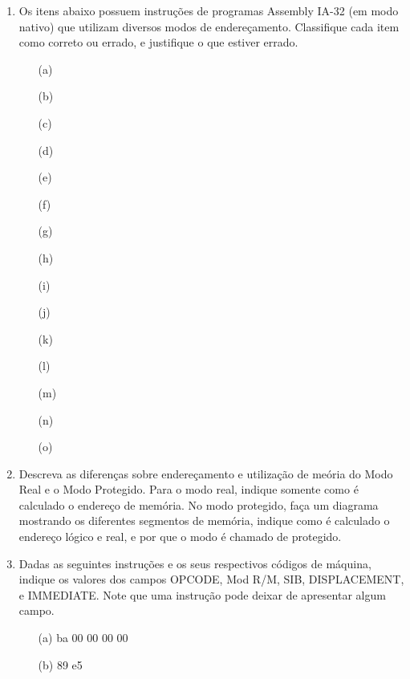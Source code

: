 \begin{enumerate}
    \item
    Os itens abaixo possuem instruções de programas Assembly IA-32 (em modo nativo) 
    que utilizam diversos modos de endereçamento. 
    Classifique cada item como correto ou errado, e justifique o que estiver errado.
    \begin{itemize}
        \item[(a)] 
        \item[(b)] 
        \item[(c)] 
        \item[(d)] 
        \item[(e)] 
        \item[(f)] 
        \item[(g)] 
        \item[(h)] 
        \item[(i)] 
        \item[(j)]  
        \item[(k)] 
        \item[(l)] 
        \item[(m)] 
        \item[(n)] 
        \item[(o)] 
    \end{itemize}

    \item
    Descreva as diferenças sobre endereçamento e utilização de meória 
    do Modo Real e o Modo Protegido. 
    Para o modo real, indique somente como é calculado o endereço de memória.
    No modo protegido, 
    faça um diagrama mostrando os diferentes segmentos de memória,
    indique como é calculado o endereço lógico e real, 
    e por que o modo é chamado de protegido.

    \item 
    Dadas as seguintes instruções e os seus respectivos códigos de máquina,
    indique os valores dos campos OPCODE, Mod R/M, SIB, DISPLACEMENT, e IMMEDIATE.
    Note que uma instrução pode deixar de apresentar algum campo.
    \begin{itemize}
        \item [(a)]  ba 00 00 00 00
        \item [(b)]  89 e5
    \end{itemize}


\end{enumerate}
